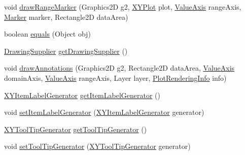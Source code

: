 \begin{DoxyCompactItemize}
\item 
void \mbox{\hyperlink{classorg_1_1jfree_1_1chart_1_1renderer_1_1xy_1_1_abstract_x_y_item_renderer_a6fbcff80e95b749f2b15e8c3f0c0cb44}{draw\+Range\+Marker}} (Graphics2D g2, \mbox{\hyperlink{classorg_1_1jfree_1_1chart_1_1plot_1_1_x_y_plot}{X\+Y\+Plot}} plot, \mbox{\hyperlink{classorg_1_1jfree_1_1chart_1_1axis_1_1_value_axis}{Value\+Axis}} range\+Axis, \mbox{\hyperlink{classorg_1_1jfree_1_1chart_1_1plot_1_1_marker}{Marker}} marker, Rectangle2D data\+Area)
\item 
boolean \mbox{\hyperlink{classorg_1_1jfree_1_1chart_1_1renderer_1_1xy_1_1_abstract_x_y_item_renderer_ab2cf5e1de6a8365a28368a482a5b3dd8}{equals}} (Object obj)
\item 
\mbox{\hyperlink{interfaceorg_1_1jfree_1_1chart_1_1plot_1_1_drawing_supplier}{Drawing\+Supplier}} \mbox{\hyperlink{classorg_1_1jfree_1_1chart_1_1renderer_1_1xy_1_1_abstract_x_y_item_renderer_a70e45e6e4e284ae4f66faf1d2e49fa32}{get\+Drawing\+Supplier}} ()
\item 
void \mbox{\hyperlink{classorg_1_1jfree_1_1chart_1_1renderer_1_1xy_1_1_abstract_x_y_item_renderer_a37ec3c795cec79a7ca741a770faffac7}{draw\+Annotations}} (Graphics2D g2, Rectangle2D data\+Area, \mbox{\hyperlink{classorg_1_1jfree_1_1chart_1_1axis_1_1_value_axis}{Value\+Axis}} domain\+Axis, \mbox{\hyperlink{classorg_1_1jfree_1_1chart_1_1axis_1_1_value_axis}{Value\+Axis}} range\+Axis, Layer layer, \mbox{\hyperlink{classorg_1_1jfree_1_1chart_1_1plot_1_1_plot_rendering_info}{Plot\+Rendering\+Info}} info)
\item 
\mbox{\hyperlink{interfaceorg_1_1jfree_1_1chart_1_1labels_1_1_x_y_item_label_generator}{X\+Y\+Item\+Label\+Generator}} \mbox{\hyperlink{classorg_1_1jfree_1_1chart_1_1renderer_1_1xy_1_1_abstract_x_y_item_renderer_a729add44689090d1e7df1ce62bffca43}{get\+Item\+Label\+Generator}} ()
\item 
void \mbox{\hyperlink{classorg_1_1jfree_1_1chart_1_1renderer_1_1xy_1_1_abstract_x_y_item_renderer_add7aa14845378a40b6db6159200cbab1}{set\+Item\+Label\+Generator}} (\mbox{\hyperlink{interfaceorg_1_1jfree_1_1chart_1_1labels_1_1_x_y_item_label_generator}{X\+Y\+Item\+Label\+Generator}} generator)
\item 
\mbox{\hyperlink{interfaceorg_1_1jfree_1_1chart_1_1labels_1_1_x_y_tool_tip_generator}{X\+Y\+Tool\+Tip\+Generator}} \mbox{\hyperlink{classorg_1_1jfree_1_1chart_1_1renderer_1_1xy_1_1_abstract_x_y_item_renderer_a1ce6222e35dd81d42ace04ab0af423e1}{get\+Tool\+Tip\+Generator}} ()
\item 
void \mbox{\hyperlink{classorg_1_1jfree_1_1chart_1_1renderer_1_1xy_1_1_abstract_x_y_item_renderer_afa8b73dbc8a04e692a889daac0a5327e}{set\+Tool\+Tip\+Generator}} (\mbox{\hyperlink{interfaceorg_1_1jfree_1_1chart_1_1labels_1_1_x_y_tool_tip_generator}{X\+Y\+Tool\+Tip\+Generator}} generator)
\end{DoxyCompactItemize}
